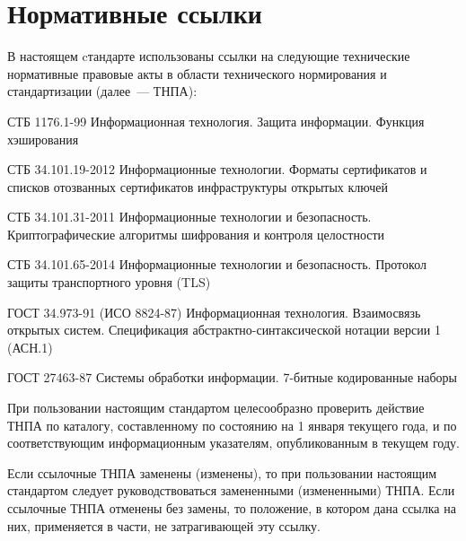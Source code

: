 \chapter{Нормативные ссылки}

В настоящем cтандарте использованы ссылки на следующие 
технические нормативные правовые акты в области 
технического нормирования и стандартизации (далее~--- ТНПА):

СТБ 1176.1-99 Информационная технология. Защита информации.
Функция хэширования

СТБ 34.101.19-2012 Информационные технологии. 
Форматы сертификатов и списков отозванных сертификатов 
инфраструктуры открытых ключей

СТБ 34.101.31-2011 Информационные технологии и безопасность. 
Криптографические алгоритмы шифрования и контроля целостности

СТБ 34.101.65-2014 Информационные технологии и безопасность. 
Протокол защиты транспортного уровня (TLS)

ГОСТ 34.973-91 (ИСО 8824-87) Информационная технология. Взаимосвязь
открытых систем. Спецификация абстрактно-синтаксической нотации
версии 1 (АСН.1)

ГОСТ 27463-87 Системы обработки информации. 7-битные кодированные наборы 

\begin{note*}
При пользовании настоящим стандартом целесообразно проверить действие ТНПА по
каталогу, составленному по состоянию на 1 января текущего года, и по
соответствующим информационным указателям, опубликованным в текущем году.

Если ссылочные ТНПА заменены (изменены), то при пользовании настоящим стандартом
следует руководствоваться замененными (измененными) ТНПА. Если ссылочные ТНПА
отменены без замены, то положение, в котором дана ссылка на них, применяется в
части, не затрагивающей эту ссылку.
\end{note*}

